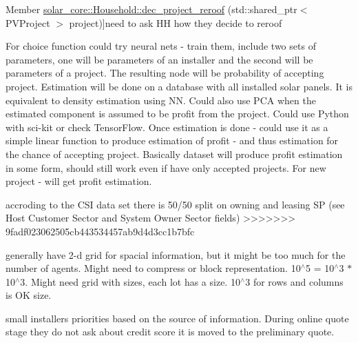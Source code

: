 \begin{DoxyRefList}
\hypertarget{wp__wp000002}{}%
Member \hyperlink{classsolar__core_1_1_household_aa63241ca3fcc1f2374d10b5c7f44124a}{solar\+\_\+core\+:\+:Household\+:\+:dec\+\_\+project\+\_\+reroof} (std\+::shared\+\_\+ptr$<$ P\+V\+Project $>$ project)]need to ask H\+H how they decide to reroof  
\item[\label{wp__wp000004}%
\hypertarget{wp__wp000004}{}%
Class \hyperlink{classsolar__core_1_1_s_e_i}{solar\+\_\+core\+:\+:S\+E\+I} ]For choice function could try neural nets -\/ train them, include two sets of parameters, one will be parameters of an installer and the second will be parameters of a project. The resulting node will be probability of accepting project. Estimation will be done on a database with all installed solar panels. It is equivalent to density estimation using N\+N. Could also use P\+C\+A when the estimated component is assumed to be profit from the project. Could use Python with sci-\/kit or check Tensor\+Flow. Once estimation is done -\/ could use it as a simple linear function to produce estimation of profit -\/ and thus estimation for the chance of accepting project. Basically dataset will produce profit estimation in some form, should still work even if have only accepted projects. For new project -\/ will get profit estimation.  
\item[\label{wp__wp000003}%
\hypertarget{wp__wp000003}{}%
Member \hyperlink{classsolar__core_1_1_s_e_i_a807561ad055ddc0df91b80ba406ee6df}{solar\+\_\+core\+:\+:S\+E\+I\+:\+:form\+\_\+design} (std\+::shared\+\_\+ptr$<$ P\+V\+Project $>$ project\+\_\+)]accroding to the C\+S\+I data set there is 50/50 split on owning and leasing S\+P (see Host Customer Sector and System Owner Sector fields) 
>>>>>>> 9fadf023062505cb443534457ab9d4d3cc1b7bfc
\item[\label{wp__wp000006}%
\hypertarget{wp__wp000006}{}%
Class \hyperlink{classsolar__core_1_1_world_map}{solar\+\_\+core\+:\+:World\+Map} ]generally have 2-\/d grid for spacial information, but it might be too much for the number of agents. Might need to compress or block representation. 10$^\wedge$5 = 10$^\wedge$3 $\ast$ 10$^\wedge$3. Might need grid with sizes, each lot has a size. 10$^\wedge$3 for rows and columns is O\+K size. 
\item[\label{wp__wp000008}%
\hypertarget{wp__wp000008}{}%
Member \hyperlink{classsolar__core_1_1_world_settings_a728f0b1c11f8ec1816d269aedc1cd80e}{solar\+\_\+core\+:\+:World\+Settings\+:\+:params\+\_\+to\+\_\+copy\+\_\+preliminary\+\_\+quote} ]small installers priorities based on the source of information. During online quote stage they do not ask about credit score it is moved to the preliminary quote. 
\end{DoxyRefList}